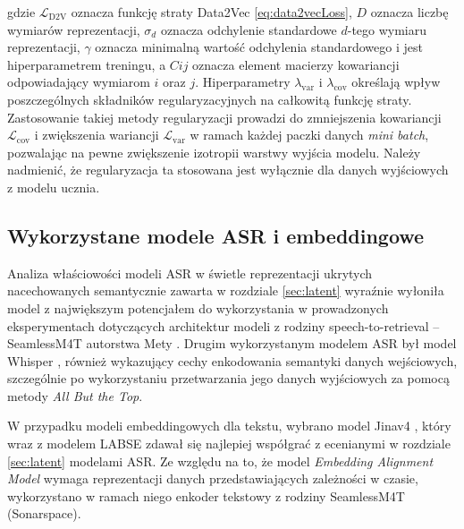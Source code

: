 gdzie $\mathcal{L}_{\mathrm{D2V}}$ oznacza funkcję straty Data2Vec \eqref{eq:data2vecLoss}, $D$ oznacza liczbę wymiarów reprezentacji, $\sigma_d$ oznacza odchylenie standardowe $d$-tego wymiaru reprezentacji, $\gamma$ oznacza minimalną wartość odchylenia standardowego i jest hiperparametrem treningu, a $C{ij}$ oznacza element macierzy kowariancji odpowiadający wymiarom $i$ oraz $j$. Hiperparametry $\lambda_{\mathrm{var}}$ i $\lambda_{\mathrm{cov}}$ określają wpływ poszczególnych składników regularyzacyjnych na całkowitą funkcję straty.
Zastosowanie takiej metody regularyzacji prowadzi do zmniejszenia kowariancji $\mathcal{L}_{\mathrm{cov}}$ i zwiększenia wariancji $\mathcal{L}_{\mathrm{var}}$ w ramach każdej paczki danych \textit{mini batch}, pozwalając na pewne zwiększenie izotropii warstwy wyjścia modelu. Należy nadmienić, że regularyzacja ta stosowana jest wyłącznie dla danych wyjściowych z modelu ucznia.

\subsection{Wykorzystane modele ASR i embeddingowe}
Analiza właściowości modeli ASR w świetle reprezentacji ukrytych nacechowanych semantycznie zawarta w rozdziale \ref{sec:latent} wyraźnie wyłoniła model z największym potencjałem do wykorzystania w prowadzonych eksperymentach dotyczących architektur modeli z rodziny speech-to-retrieval -- SeamlessM4T autorstwa Mety \cite{m4t}. Drugim wykorzystanym modelem ASR był model Whisper \cite{whisper}, również wykazujący cechy enkodowania semantyki danych wejściowych, szczególnie po wykorzystaniu przetwarzania jego danych wyjściowych za pomocą metody \textit{All But the Top}.

W przypadku modeli embeddingowych dla tekstu, wybrano model Jinav4 \cite{jina_v4}, który wraz z modelem LABSE\cite{feng-etal-2022-language} zdawał się najlepiej współgrać z ecenianymi w rozdziale \ref{sec:latent} modelami ASR. Ze względu na to, że model \textit{Embedding Alignment Model} wymaga reprezentacji danych przedstawiających zależności w czasie, wykorzystano w ramach niego enkoder tekstowy z rodziny SeamlessM4T (Sonarspace).

